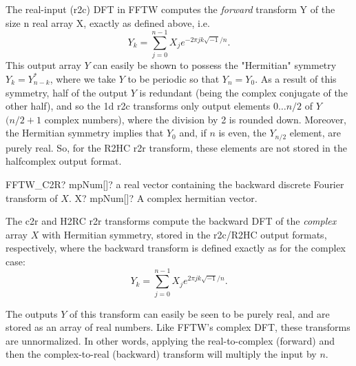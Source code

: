 \vspace{0.3cm}
The real-input (r2c) DFT in FFTW computes the \textit{forward} transform Y of the size n real
array X, exactly as defined above, i.e.
\begin{equation}
Y_k = \sum^{n-1}_{j=0} X_j e^{-2\pi jk \sqrt{-1}/n}.
\end{equation}
This output array $Y$ can easily be shown to possess the "Hermitian" symmetry $Y_k = Y^*_{
	n-k}$, where we take $Y$ to be periodic so that $Y_n = Y_0$.
As a result of this symmetry, half of the output $Y$ is redundant (being the complex conjugate
of the other half), and so the 1d r2c transforms only output elements $0 \ldots n/2$ of $Y$ $(n/2+1$ complex numbers), where the division by 2 is rounded down.
Moreover, the Hermitian symmetry implies that $Y_0$ and, if $n$ is even, the $Y_{n/2}$  element, are purely real. So, for the R2HC r2r transform, these elements are not stored in the halfcomplex output format.

\vspace{0.6cm}
\begin{mpFunctionsExtract}
	\mpFunctionOne
	{FFTW\_C2R? mpNum[]? a real vector containing the backward  discrete Fourier transform of $X$.}
	{X? mpNum[]? A complex hermitian vector.}
\end{mpFunctionsExtract}



The c2r and H2RC r2r transforms compute the backward DFT of the \textit{complex} array $X$
with Hermitian symmetry, stored in the r2c/R2HC output formats, respectively, where the
backward transform is defined exactly as for the complex case:
\begin{equation}
Y_k = \sum^{n-1}_{j=0} X_j e^{2\pi jk \sqrt{-1}/n}.
\end{equation}

The outputs $Y$ of this transform can easily be seen to be purely real, and are stored as an
array of real numbers.
Like FFTW’s complex DFT, these transforms are unnormalized. In other words, applying the real-to-complex (forward) and then the complex-to-real (backward) transform will
multiply the input by $n$.



